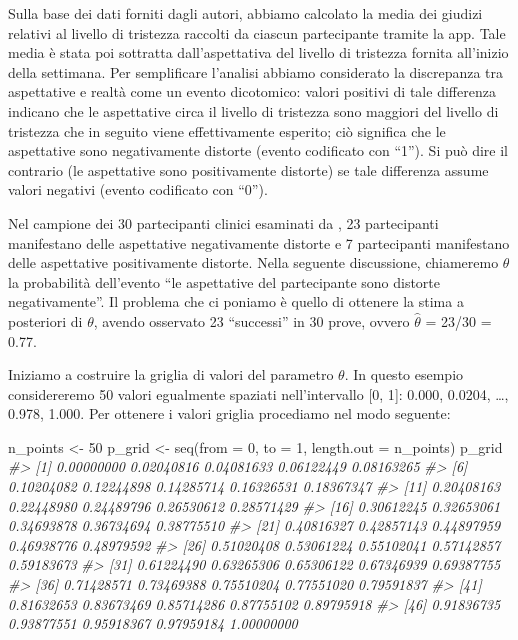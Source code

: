 \documentclass[
]{memoir}
\newenvironment{Shaded}{\begin{snugshade}}{\end{snugshade}}
\newcommand{\AttributeTok}[1]{\textcolor[rgb]{0.77,0.63,0.00}{#1}}
\newcommand{\CommentTok}[1]{\textcolor[rgb]{0.56,0.35,0.01}{\textit{#1}}}
\newcommand{\DecValTok}[1]{\textcolor[rgb]{0.00,0.00,0.81}{#1}}
\newcommand{\FunctionTok}[1]{\textcolor[rgb]{0.00,0.00,0.00}{#1}}
\newcommand{\NormalTok}[1]{#1}
\newcommand{\OtherTok}[1]{\textcolor[rgb]{0.56,0.35,0.01}{#1}}
\begin{document}
Sulla base dei dati forniti dagli autori, abbiamo calcolato la media dei giudizi relativi al livello di tristezza raccolti da ciascun partecipante tramite la app. Tale media è stata poi sottratta dall'aspettativa del livello di tristezza fornita all'inizio della settimana. Per semplificare l'analisi abbiamo considerato la discrepanza tra aspettative e realtà come un evento dicotomico: valori positivi di tale differenza indicano che le aspettative circa il livello di tristezza sono maggiori del livello di tristezza che in seguito viene effettivamente esperito; ciò significa che le aspettative sono negativamente distorte (evento codificato con ``1''). Si può dire il contrario (le aspettative sono positivamente distorte) se tale differenza assume valori negativi (evento codificato con ``0'').

Nel campione dei 30 partecipanti clinici esaminati da \citet{zetschefuture2019}, 23 partecipanti manifestano delle aspettative negativamente distorte e 7 partecipanti manifestano delle aspettative positivamente distorte. Nella seguente discussione, chiameremo \(\theta\) la probabilità dell'evento ``le aspettative del partecipante sono distorte negativamente''. Il problema che ci poniamo è quello di ottenere la stima a posteriori di \(\theta\), avendo osservato 23 ``successi'' in 30 prove, ovvero \(\hat{\theta}\) = 23/30 = 0.77.

Iniziamo a costruire la griglia di valori del parametro \(\theta\). In questo esempio considereremo 50 valori egualmente spaziati nell'intervallo {[}0, 1{]}: 0.000, 0.0204, \ldots, 0.978, 1.000. Per ottenere i valori griglia procediamo nel modo seguente:

\begin{Shaded}
\begin{Highlighting}[]
\NormalTok{n\_points }\OtherTok{\textless{}{-}} \DecValTok{50}
\NormalTok{p\_grid }\OtherTok{\textless{}{-}} \FunctionTok{seq}\NormalTok{(}\AttributeTok{from =} \DecValTok{0}\NormalTok{, }\AttributeTok{to =} \DecValTok{1}\NormalTok{, }\AttributeTok{length.out =}\NormalTok{ n\_points)}
\NormalTok{p\_grid}
\CommentTok{\#\textgreater{}  [1] 0.00000000 0.02040816 0.04081633 0.06122449 0.08163265}
\CommentTok{\#\textgreater{}  [6] 0.10204082 0.12244898 0.14285714 0.16326531 0.18367347}
\CommentTok{\#\textgreater{} [11] 0.20408163 0.22448980 0.24489796 0.26530612 0.28571429}
\CommentTok{\#\textgreater{} [16] 0.30612245 0.32653061 0.34693878 0.36734694 0.38775510}
\CommentTok{\#\textgreater{} [21] 0.40816327 0.42857143 0.44897959 0.46938776 0.48979592}
\CommentTok{\#\textgreater{} [26] 0.51020408 0.53061224 0.55102041 0.57142857 0.59183673}
\CommentTok{\#\textgreater{} [31] 0.61224490 0.63265306 0.65306122 0.67346939 0.69387755}
\CommentTok{\#\textgreater{} [36] 0.71428571 0.73469388 0.75510204 0.77551020 0.79591837}
\CommentTok{\#\textgreater{} [41] 0.81632653 0.83673469 0.85714286 0.87755102 0.89795918}
\CommentTok{\#\textgreater{} [46] 0.91836735 0.93877551 0.95918367 0.97959184 1.00000000}
\end{Highlighting}
\end{Shaded}
\end{document}
